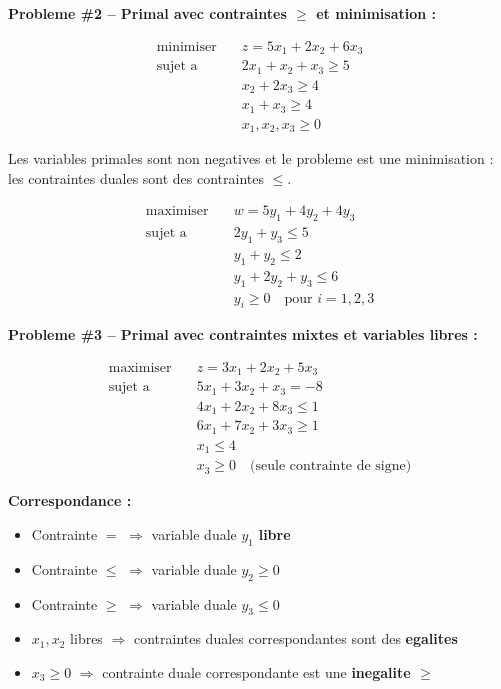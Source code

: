 \documentclass[12pt,a4paper]{article}
\begin{document}
\newpage

\begin{exemple}
\textbf{Probleme \#2 -- Primal avec contraintes $\geq$ et minimisation :}

\begin{align*}
\text{minimiser} \quad & z = 5x_1 + 2x_2 + 6x_3\\
\text{sujet a} \quad & 2x_1 + x_2 + x_3 \geq 5\\
& x_2 + 2x_3 \geq 4\\
& x_1 + x_3 \geq 4\\
& x_1, x_2, x_3 \geq 0
\end{align*}

Les variables primales sont non negatives et le probleme est une minimisation : les contraintes duales sont des contraintes $\leq$.

\begin{align*}
\text{maximiser} \quad & w = 5y_1 + 4y_2 + 4y_3\\
\text{sujet a} \quad & 2y_1 + y_3 \leq 5\\
& y_1 + y_2 \leq 2\\
& y_1 + 2y_2 + y_3 \leq 6\\
& y_i \geq 0 \quad \text{pour } i = 1, 2, 3
\end{align*}
\end{exemple}

\begin{exemple}
\textbf{Probleme \#3 -- Primal avec contraintes mixtes et variables libres :}

\begin{align*}
\text{maximiser} \quad & z = 3x_1 + 2x_2 + 5x_3\\
\text{sujet a} \quad & 5x_1 + 3x_2 + x_3 = -8\\
& 4x_1 + 2x_2 + 8x_3 \leq 1\\
& 6x_1 + 7x_2 + 3x_3 \geq 1\\
& x_1 \leq 4\\
& x_3 \geq 0 \quad \text{(seule contrainte de signe)}
\end{align*}

\textbf{Correspondance :}
\begin{itemize}
    \item Contrainte $=$ $\Rightarrow$ variable duale $y_1$ \textcolor{algoviolet}{\textbf{libre}}
    \item Contrainte $\leq$ $\Rightarrow$ variable duale $y_2 \geq 0$
    \item Contrainte $\geq$ $\Rightarrow$ variable duale $y_3 \leq 0$
    \item $x_1, x_2$ libres $\Rightarrow$ contraintes duales correspondantes sont des \textcolor{algoviolet}{\textbf{egalites}}
    \item $x_3 \geq 0$ $\Rightarrow$ contrainte duale correspondante est une \textcolor{defvert}{\textbf{inegalite $\geq$}}
\end{itemize}
\end{exemple}
\end{document}
